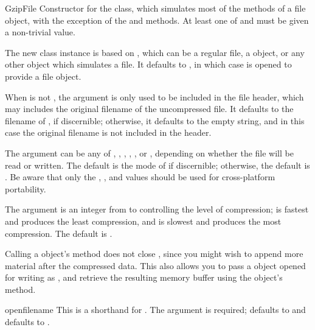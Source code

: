 \begin{classdesc}{GzipFile}{}
Constructor for the  class, which simulates most of
the methods of a file object, with the exception of the
 and  methods.  At least one of
 and  must be given a non-trivial value.

The new class instance is based on , which can be a
regular file, a  object, or any other object which
simulates a file.  It defaults to , in which case
 is opened to provide a file object.

When  is not , the  argument is
only used to be included in the  file header, which may
includes the original filename of the uncompressed file.  It defaults
to the filename of , if discernible; otherwise, it
defaults to the empty string, and in this case the original filename
is not included in the header.

The  argument can be any of , ,
, , , or , depending on
whether the file will be read or written.  The default is the mode of
 if discernible; otherwise, the default is .
Be aware that only the , , and 
values should be used for cross-platform portability.

The  argument is an integer from  to
 controlling the level of compression;  is fastest and
produces the least compression, and  is slowest and produces
the most compression.  The default is .

Calling a  object's  method does not
close , since you might wish to append more material
after the compressed data.  This also allows you to pass a
 object opened for writing as , and
retrieve the resulting memory buffer using the 
object's  method.
\end{classdesc}

\begin{funcdesc}{open}{filename}
This is a shorthand for 
 .  The 
argument is required;  defaults to  and
 defaults to .
\end{funcdesc}

\begin{seealso}
\end{seealso}
